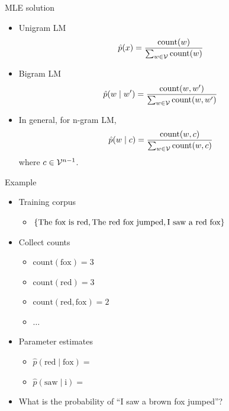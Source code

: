 \documentclass[usenames,dvipsnames,notes]{beamer}
\begin{document}
\begin{frame}
    {MLE solution}
    \begin{itemize}
        \itemsep1em
        \item Unigram LM
            $$
            \hat{p}(x) = \frac{\text{count}(w)}{\sum_{w\in\mathcal{V}}\text{count}(w)}
            $$
        \item Bigram LM
            $$
            \hat{p}(w\mid w') =
            \frac{\text{count}(w,w')}{\sum_{w\in\mathcal{V}}\text{count}(w,w')}
            $$
        \item In general, for n-gram LM,
            $$
            \hat{p}(w\mid c) =
            \frac{\text{count}(w,c)}{\sum_{w\in\mathcal{V}}\text{count}(w,c)}
            $$
            where $c\in \mathcal{V}^{n-1}$.
    \end{itemize}
\end{frame}

\begin{frame}
    {Example}
    \begin{itemize}
        \item Training corpus
            \begin{itemize}
                \item[] $\left\{ \text{The fox is red},
                    \text{The red fox jumped},
                    \text{I saw a red fox}
                     \right\}$
            \end{itemize}
        \item Collect counts
            \begin{itemize}
                \item[] $\text{count}(\text{fox})=3$
                \item[] $\text{count}(\text{red})=3$
                \item[] $\text{count}(\text{red}, \text{fox})=2$
                \item[] $\ldots$
            \end{itemize}
        \item Parameter estimates
            \begin{itemize}
                \item[] $\hat{p}(\text{red}\mid\text{fox})=$
                \item[] $\hat{p}(\text{saw}\mid\text{i})=$
            \end{itemize}
        \pause
        \item What is the probability of ``I saw a brown fox jumped''?
    \end{itemize}
\end{frame}
\end{document}
